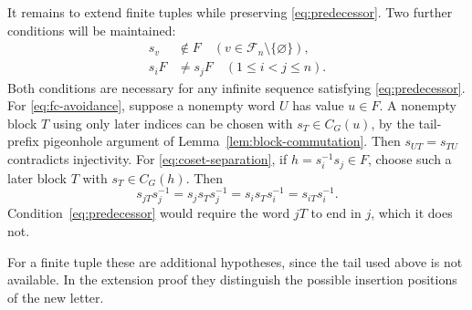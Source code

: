 \documentclass[11pt,letterpaper]{amsart}
\theoremstyle{definition}
\theoremstyle{remark}
\begin{document}
It remains to extend finite tuples while preserving
\eqref{eq:predecessor}. Two further conditions will be maintained:
\begin{align}
 s_v&\notin F\quad
       (v\in\mathcal F_n\setminus\{\varnothing\}),
       \label{eq:fc-avoidance}\\
 s_iF&\ne s_jF\quad(1\leq i<j\leq n).
       \label{eq:coset-separation}
\end{align}
Both conditions are necessary for any infinite sequence satisfying
\eqref{eq:predecessor}. For \eqref{eq:fc-avoidance}, suppose a nonempty
word $U$ has value $u\in F$. A nonempty block $T$ using only later
indices can be chosen with $s_T\in C_G(u)$, by the tail-prefix
pigeonhole argument of Lemma~\ref{lem:block-commutation}.
Then $s_{UT}=s_{TU}$ contradicts injectivity.
For \eqref{eq:coset-separation}, if $h=s_i^{-1}s_j\in F$, choose
such a later block $T$ with $s_T\in C_G(h)$. Then
\[
 s_{jT}s_j^{-1}=s_j s_Ts_j^{-1}
 =s_i s_Ts_i^{-1}=s_{iT}s_i^{-1}.
\]
Condition~\eqref{eq:predecessor} would require the word $jT$ to end
in $j$, which it does not.

For a finite tuple these are additional hypotheses, since the tail
used above is not available. In the extension proof they distinguish
the possible insertion positions of the new letter.
\end{document}
